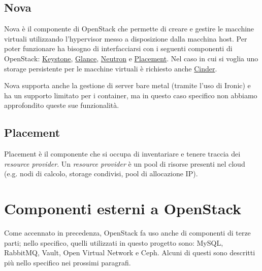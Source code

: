 \subsection{Nova}\label{sec:openstack_nova}
Nova è il componente di OpenStack che permette di creare e gestire le macchine virtuali utilizzando l'hypervisor messo a disposizione dalla macchina host. Per poter funzionare ha bisogno di interfacciarsi con i seguenti componenti di OpenStack: \hyperref[sec:openstack_keystone]{Keystone}, \hyperref[sec:openstack_glance]{Glance}, \hyperref[sec:openstack_neutron]{Neutron} e \hyperref[sec:openstack_placement]{Placement}. Nel caso in cui si voglia uno storage persistente per le macchine virtuali è richiesto anche \hyperref[sec:openstack_cinder]{Cinder}.

Nova supporta anche la gestione di server bare metal (tramite l'uso di Ironic) e ha un supporto limitato per i container, ma in questo caso specifico non abbiamo approfondito queste sue funzionalità.

\subsection{Placement}\label{sec:openstack_placement}
Placement è il componente che si occupa di inventariare e tenere traccia dei \textit{resource provider}. Un \textit{resource provider} è un pool di risorse presenti nel cloud (e.g. nodi di calcolo, storage condivisi, pool di allocazione IP).

\section{Componenti esterni a OpenStack}\label{sec:openstack_external_components}
Come accennato in precedenza, OpenStack fa uso anche di componenti di terze parti; nello specifico, quelli utilizzati in questo progetto sono: MySQL, RabbitMQ, Vault, Open Virtual Network e Ceph. Alcuni di questi sono descritti più nello specifico nei prossimi paragrafi.

